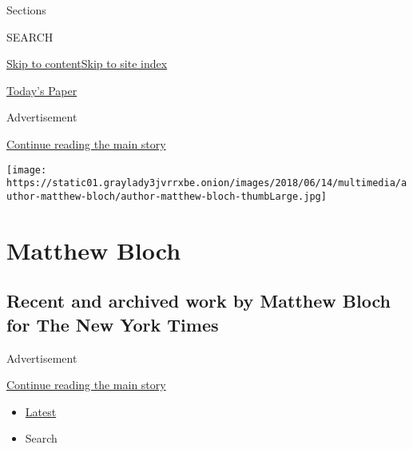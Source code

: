 Sections

SEARCH

\protect\hyperlink{site-content}{Skip to
content}\protect\hyperlink{site-index}{Skip to site index}

\href{https://myaccount.nytimes3xbfgragh.onion/auth/login?response_type=cookie\&client_id=vi}{}

\href{https://www.nytimes3xbfgragh.onion/section/todayspaper}{Today's
Paper}

Advertisement

\protect\hyperlink{after-top}{Continue reading the main story}

\texttt{[image: https://static01.graylady3jvrrxbe.onion/images/2018/06/14/multimedia/author-matthew-bloch/author-matthew-bloch-thumbLarge.jpg]}

\hypertarget{matthew-bloch}{%
\section{Matthew Bloch}\label{matthew-bloch}}

\hypertarget{recent-and-archived-work-by-matthew-bloch-for-the-new-york-times}{%
\subsection{Recent and archived work by Matthew Bloch for The New York
Times}\label{recent-and-archived-work-by-matthew-bloch-for-the-new-york-times}}

Advertisement

\protect\hyperlink{after-mid1}{Continue reading the main story}

\begin{itemize}
\tightlist
\item
  \protect\hyperlink{stream-panel}{Latest}
\item
  Search
\end{itemize}

